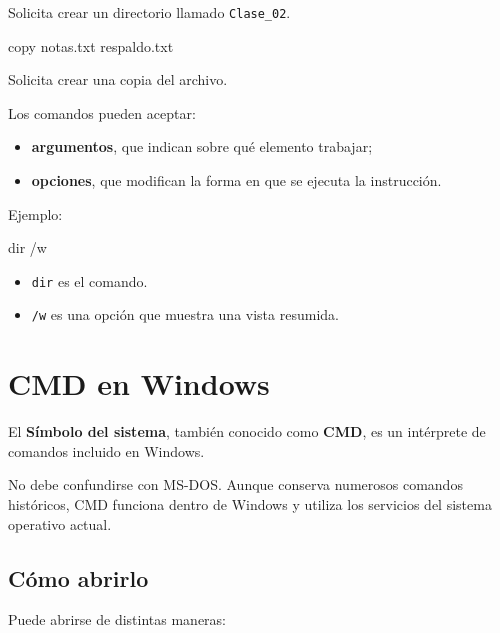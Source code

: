 \documentclass[
  spanish,
  letterpaper,
]{scrbook}
\newenvironment{Shaded}{\begin{snugshade}}{\end{snugshade}}
\newcommand{\AttributeTok}[1]{\textcolor[rgb]{0.40,0.45,0.13}{#1}}
\newcommand{\BuiltInTok}[1]{\textcolor[rgb]{0.00,0.23,0.31}{#1}}
\newcommand{\NormalTok}[1]{\textcolor[rgb]{0.00,0.23,0.31}{#1}}
\providecommand{\tightlist}{%
  \setlength{\itemsep}{0pt}\setlength{\parskip}{0pt}}
\begin{document}
Solicita crear un directorio llamado \texttt{Clase\_02}.

\begin{Shaded}
\begin{Highlighting}[]
\BuiltInTok{copy}\NormalTok{ notas.txt respaldo.txt}
\end{Highlighting}
\end{Shaded}

Solicita crear una copia del archivo.

Los comandos pueden aceptar:

\begin{itemize}
\tightlist
\item
  \textbf{argumentos}, que indican sobre qué elemento trabajar;
\item
  \textbf{opciones}, que modifican la forma en que se ejecuta la
  instrucción.
\end{itemize}

Ejemplo:

\begin{Shaded}
\begin{Highlighting}[]
\BuiltInTok{dir} \AttributeTok{/w}
\end{Highlighting}
\end{Shaded}

\begin{itemize}
\tightlist
\item
  \texttt{dir} es el comando.
\item
  \texttt{/w} es una opción que muestra una vista resumida.
\end{itemize}


\chapter{CMD en Windows}\label{cmd-en-windows}

El \textbf{Símbolo del sistema}, también conocido como \textbf{CMD}, es
un intérprete de comandos incluido en Windows.

No debe confundirse con MS-DOS. Aunque conserva numerosos comandos
históricos, CMD funciona dentro de Windows y utiliza los servicios del
sistema operativo actual.

\section{Cómo abrirlo}\label{cuxf3mo-abrirlo}

Puede abrirse de distintas maneras:
\end{document}
